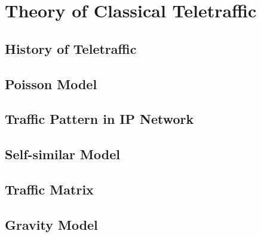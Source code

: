 \section{Theory of Classical Teletraffic}
\label{theory_of_classical_teletraffic}

\subsection{History of Teletraffic}
\subsection{Poisson Model}
\subsection{Traffic Pattern in IP Network}
\subsection{Self-similar Model}
\subsection{Traffic Matrix}
\subsection{Gravity Model}

